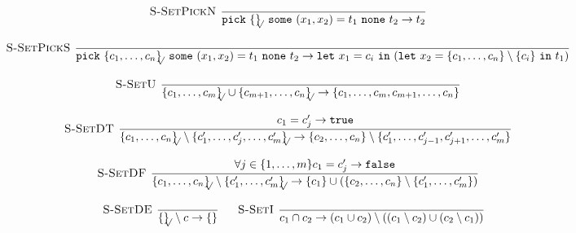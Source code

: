 \documentclass[a4paper]{article}
\newcommand{\s}[1]{\mathtt{#1}}
\newcommand{\sLb}{\s{\{}}
\newcommand{\sRb}{\s{\}}}
\newcommand{\spick}[3]{\s{pick}\ #1\ \s{some}\ #2\ \s{none}\ #3}
\newcommand{\sletin}[2]{\s{let\ } #1 \s{\ in\ } #2}
\newcommand{\strue}{\s{true}}
\newcommand{\sfalse}{\s{false}}
\newcommand{\sset}[1]{\sLb #1 \sRb}
\newcommand{\ssetc}[1]{\sset{#1}_{\!\!\!\surd}}
\newcommand{\step}{\to}
\newcommand{\dotset}[2]{\{#1,\ldots,#2\}}
\renewcommand{\rule}[3][]{\ \mbox{\textsc{#1 }}\dfrac{#2}{#3}\ }
\begin{document}
\[\begin{array}{c}
\rule[S-SetPickN]{}{\spick{\ssetc{}}{(x_1,x_2) = t_1}{t_2} \step t_2}
\quad\\\\
\rule[S-SetPickS]{}{\spick{\ssetc{c_1,\ldots,c_n}}{(x_1,x_2) = t_1}{t_2} \step \sletin{x_1 = c_i}{(\sletin{x_2 = \sset{c_1,\ldots,c_n}\setminus\sset{c_i}}{t_1}})}
\quad\\\\
\rule[S-SetU]{}{\ssetc{c_1,\ldots,c_m} \cup \ssetc{c_{m+1},\ldots,c_n} \step
\{c_1,\ldots,c_m,c_{m+1},\ldots,c_n\}}
\quad\\\\
\rule[S-SetDT]{c_1 = c'_j \step \strue}
{\ssetc{c_1,\ldots,c_n} \setminus \ssetc{c'_1,\ldots,c'_j,\ldots,c'_m} \step
  \sset{c_2,\ldots,c_n} \setminus \sset{c'_1,\ldots,c'_{j-1},c'_{j+1},\ldots,c'_m}
}
\quad\\\\
\rule[S-SetDF]{\forall j \in \dotset{1}{m} c_1 = c'_j \step \sfalse}
{\ssetc{c_1,\ldots,c_n} \setminus \ssetc{c'_1,\ldots,c'_m} \step
  \sset{c_1} \cup (\sset{c_2,\ldots,c_n} \setminus \sset{c'_1,\ldots,c'_m})
}
\quad\\\\
\rule[S-SetDE]{}{\ssetc{} \setminus c \step \sset{}}
\quad
\rule[S-SetI]{}{c_1 \cap c_2 \step (c_1 \cup c_2) \setminus ((c_1 \setminus c_2) \cup (c_2 \setminus c_1))}
\end{array}\]
\end{document}
